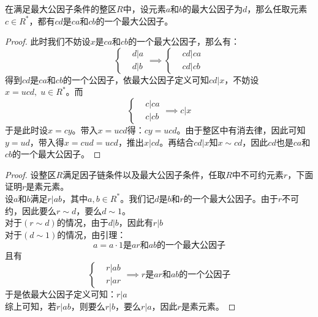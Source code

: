 在满足最大公因子条件的整区$R$中，设元素$a$和$b$的最大公因子为$d$，那么任取元素$c\in R^*$，都有$cd$是$ca$和$cb$的一个最大公因子。
\begin{proof}
此时我们不妨设$x$是$ca$和$cb$的一个最大公因子，那么有：
\[
\left\{
\begin{aligned}
&d|a\\
&d|b
\end{aligned}\right.
\implies
\left\{
\begin{aligned}
&cd|ca\\
&cd|cb
\end{aligned}\right.
\]
得到$cd$是$ca$和$cb$的一个公因子，依最大公因子定义可知$cd|x$，不妨设$x=ucd,\; u\in R^*$。而
\[
\left\{
\begin{aligned}
&c|ca\\
&c|cb
\end{aligned}\right.
\implies c|x
\]
\indent 于是此时设$x=cy$。带入$x=ucd$得：$cy=ucd$。由于整区中有消去律，因此可知$y=ud$，带入得$x=cud=ucd$，推出$x|cd$。再结合$cd|x$知$x\sim cd$，因此$cd$也是$ca$和$cb$的一个最大公因子。
\end{proof}
\begin{proof}
\indent 设整区$R$满足因子链条件以及最大公因子条件，任取$R$中不可约元素$r$，下面证明$r$是素元素。\\
\indent 设$a$和$b$满足$r|ab$，其中$a,b\in R^*$。我们记$d$是$b$和$r$的一个最大公因子。由于$r$不可约，因此要么$r\sim d$，要么$d\sim 1$。\\
\indent 对于$(r\sim d)$的情况，由于$d|b$，因此有$r|b$\\
\indent 对于$(d\sim 1)$的情况，由引理：
\[
a=a\cdot 1\text{是}ar\text{和}ab\text{的一个最大公因子}
\]
且有
\[
\left\{
\begin{aligned}
&r|ab\\
&r|ar
\end{aligned}\right.
\implies
r\text{是}ar\text{和}ab\text{的一个公因子}
\]
于是依最大公因子定义可知：$r|a$\\
\indent 综上可知，若$r|ab$，则要么$r|b$，要么$r|a$，因此$r$是素元素。
\end{proof}

